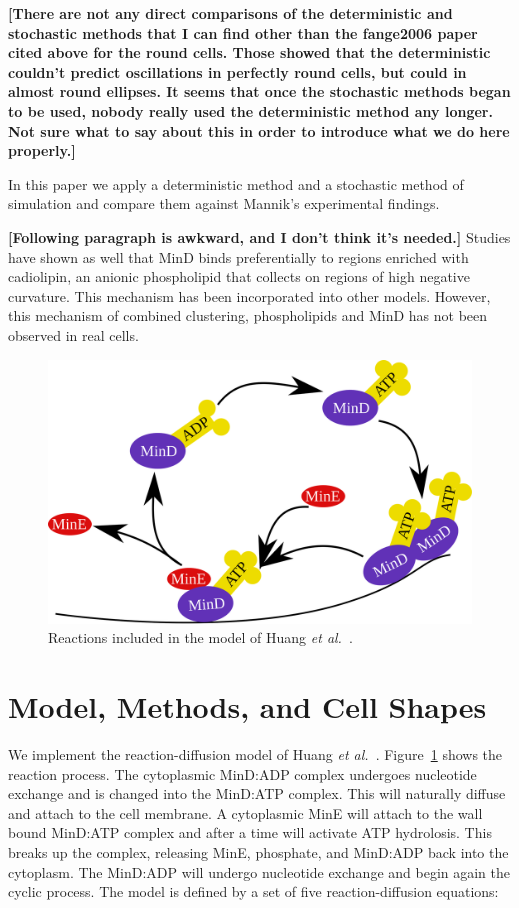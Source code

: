 \documentclass[letterpaper,twocolumn,amsmath,amssymb,pre]{revtex4-1}
\newcommand{\red}[1]{{\bf \color{red} #1}}
\newcommand{\fixme}[1]{\red{[#1]}}
\begin{document}
\fixme{There are not any direct comparisons of the deterministic and
  stochastic methods that I can find other than the fange2006 paper
  cited above for the round cells.  Those showed that the
  deterministic couldn't predict oscillations in perfectly round
  cells, but could in almost round ellipses.  It seems that once the
  stochastic methods began to be used, nobody really used the
  deterministic method any longer.  Not sure what to say about this in
  order to introduce what we do here properly.}

In this paper we apply a deterministic method and a stochastic method
of simulation and compare them against Mannik's experimental findings.


\fixme{Following paragraph is awkward, and I don't think it's needed.}
Studies have shown as well that MinD binds preferentially to regions
enriched with cadiolipin, an anionic phospholipid that collects on
regions of high negative curvature. This mechanism has been
incorporated into other
models.\cite{drew2005polymerization,cytrynbaum2007multistranded,renner2012mind,renner2012mind}
However, this mechanism of combined clustering, phospholipids and MinD
has not been observed in real cells. \cite{halatek2012highly}


\begin{figure}
  \includegraphics[width=\columnwidth]{reactions}
  \caption{Reactions included in the model of Huang \emph{et
      al.}~\cite{huang2003dynamic}.}\label{fig:reactions}
\end{figure}


\section{Model, Methods, and Cell Shapes}\label{sec:model-method-shapes}
We implement the reaction-diffusion model of Huang \emph{et
  al.}~\cite{huang2003dynamic}.  Figure~\ref{fig:reactions} shows the
reaction process.  The cytoplasmic MinD:ADP complex undergoes
nucleotide exchange and is changed into the MinD:ATP complex.  This
will naturally diffuse and attach to the cell membrane.  A cytoplasmic
MinE will attach to the wall bound MinD:ATP complex and after a time
will activate ATP hydrolosis.  This breaks up the complex, releasing
MinE, phosphate, and MinD:ADP back into the cytoplasm.  The MinD:ADP
will undergo nucleotide exchange and begin again the cyclic process.
The model is defined by a set of five reaction-diffusion equations:
\end{document}
